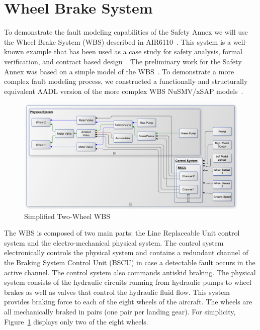 \section{Wheel Brake System}
\label{sec:wbs}
To demonstrate the fault modeling capabilities of the Safety Annex we will use the Wheel Brake System (WBS) described in AIR6110~\cite{AIR6110}.  This system is a well-known example that has been used as a case study for safety analysis, formal verification, and contract based design~\cite{DBLP:conf/cav/BozzanoCPJKPRT15, contractBasedDesign, CAV2015:BoCiGrMa, Joshi05:SafeComp}. The preliminary work for the Safety Annex was based on a simple model of the WBS~\cite{Stewart17:IMBSA}. To demonstrate a more complex fault modeling process, we constructed a functionally and structurally equivalent AADL version of the more complex WBS NuSMV/xSAP models~\cite{DBLP:conf/cav/BozzanoCPJKPRT15}.    

\begin{figure}[htbp]
	\centering
	\includegraphics[trim=0 9 0 5,clip,width=\textwidth]{images/wbs_arch4_diagram.pdf}
	\caption{Simplified Two-Wheel WBS}
	\label{fig:wbs}
\end{figure} 

The WBS is composed of two main parts: the Line Replaceable Unit control system and the electro-mechanical physical system.
The control system electronically controls the physical system and contains a redundant
channel of the Braking System Control Unit (BSCU) in case a detectable fault occurs in the active channel.
The control system also commands antiskid braking. %
 The physical system consists of the hydraulic circuits running from hydraulic pumps to wheel brakes as well as valves that control the hydraulic fluid flow. This system provides braking force to each of the eight wheels of the aircraft. The wheels are all mechanically braked in pairs (one pair per landing gear). For simplicity, Figure~\ref{fig:wbs} displays only two of the eight wheels. 


